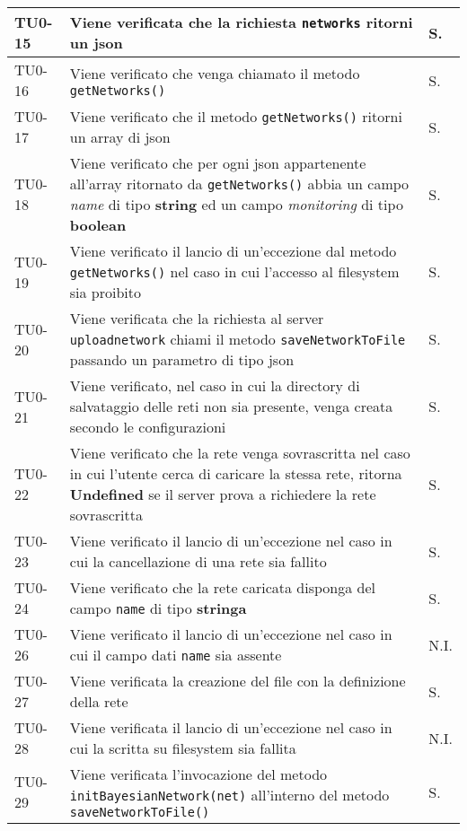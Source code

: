 \begin{longtable}{|C{.15\textwidth}|m{.66\textwidth}|C{.10\textwidth}|}
\hline 
{}TU0-15 & Viene verificata che la richiesta \texttt{networks} ritorni un json & S. \\ 
\hline 
TU0-16 & Viene verificato che venga chiamato il metodo \texttt{getNetworks()} & S. \\
\hline 
{}TU0-17 & Viene verificato che il metodo \texttt{getNetworks()} ritorni un array di json & S. \\ 
\hline
TU0-18 & Viene verificato che per ogni json appartenente all'array ritornato da \texttt{getNetworks()} abbia un campo \textit{name} di tipo \textbf{string} ed un campo \textit{monitoring} di tipo \textbf{boolean} & S. \\ 
\hline
{}TU0-19 & Viene verificato il lancio di un'eccezione dal metodo \texttt{getNetworks()} nel caso in cui l'accesso al filesystem sia proibito & S. \\ 
\hline 
TU0-20 & Viene verificata che la richiesta al server \texttt{uploadnetwork} chiami il metodo \texttt{saveNetworkToFile} passando un parametro di tipo json & S. \\ 
\hline 
{}TU0-21 & Viene verificato, nel caso in cui la directory di salvataggio delle reti non sia presente, venga creata secondo le configurazioni & S. \\ 
\hline 
TU0-22 & Viene verificato che la rete venga sovrascritta nel caso in cui l'utente cerca di caricare la stessa rete, ritorna \textbf{Undefined} se il server prova a richiedere la rete sovrascritta & S. \\
\hline
{}TU0-23 & Viene verificato il lancio di un'eccezione nel caso in cui la cancellazione di una rete sia fallito & S. \\ 
\hline
TU0-24 & Viene verificato che la rete caricata disponga del campo \texttt{name} di tipo \textbf{stringa} & S. \\ 
\hline 
 TU0-26 & Viene verificato il lancio di un'eccezione nel caso in cui il campo dati \texttt{name} sia assente & N.I. \\ 
\hline 
{}TU0-27	 & Viene verificata la creazione del file con la definizione della rete & S. \\ 
\hline 
 TU0-28 & Viene verificata il lancio di un'eccezione nel caso in cui la scritta su filesystem sia fallita & N.I. \\ 
\hline 
{}TU0-29 & Viene verificata l'invocazione del metodo \texttt{initBayesianNetwork(net)} all'interno del metodo \texttt{saveNetworkToFile()} & S. \\ 

\end{longtable}
